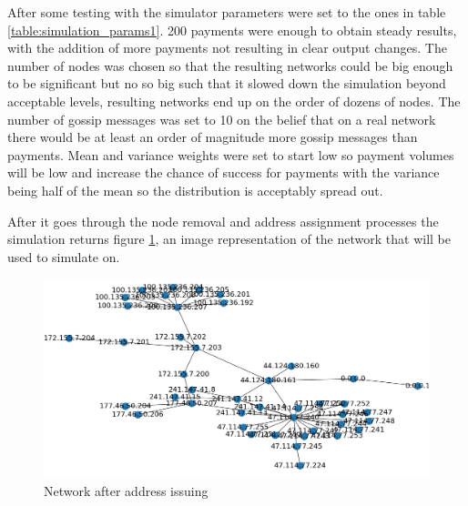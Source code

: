 After some testing with the simulator parameters were set to the ones in table \ref{table:simulation_params1}. 200 payments were enough to obtain steady results, with the addition of more payments not resulting in clear output changes. The number of nodes was chosen so that the resulting networks could be big enough to be significant but no so big such that it slowed down the simulation beyond acceptable levels, resulting networks end up
on the order of dozens of nodes. The number of gossip messages was set to 10 on the belief that on a real network there would be at least an order of magnitude more gossip messages than payments. Mean and variance weights were set to start low so payment volumes will be low and increase the chance of success for payments with the variance being half of the mean so the distribution is acceptably spread out.

\begin{table}[H]
\label{table:simulation_params1}
\end{table}

After it goes through the node removal and address assignment processes the simulation returns figure \ref{fig:sim_net_addr}, an image representation of the network that will be used to simulate on.

\begin{figure}[H]
\begin{center}
  \includegraphics[width=\linewidth]{images/sim_net_addr.png}
  \caption{Network after address issuing}
  \label{fig:sim_net_addr}
  \end{center}
\end{figure}

